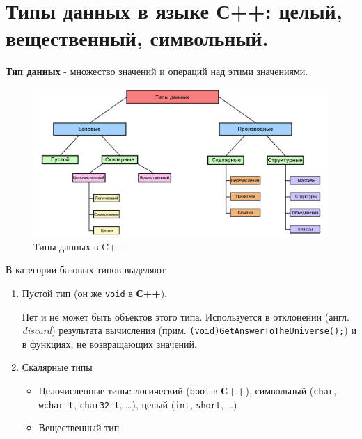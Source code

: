 \section{Типы данных в языке С++: целый, вещественный,
символьный.}\label{ux442ux438ux43fux44b-ux434ux430ux43dux43dux44bux445-ux432-ux44fux437ux44bux43aux435-ux441-ux446ux435ux43bux44bux439-ux432ux435ux449ux435ux441ux442ux432ux435ux43dux43dux44bux439-ux441ux438ux43cux432ux43eux43bux44cux43dux44bux439.}

\textbf{Тип данных} - множество значений и операций над этими
значениями.

\begin{figure}
\centering
\includegraphics{./res/сpp-types.png}
\caption{Типы данных в C++}
\end{figure}

В категории базовых типов выделяют

\begin{enumerate}
\def\labelenumi{\arabic{enumi})}
\item
  Пустой тип (он же \texttt{void} в \textbf{С++}).

  Нет и не может быть объектов этого типа. Используется в отклонении
  (англ. \emph{discard}) результата вычисления (прим.
  \texttt{(void)GetAnswerToTheUniverse();}) и в функциях, не
  возвращающих значений.
\item
  Скалярные типы

  \begin{itemize}
  \item
    Целочисленные типы: логический (\texttt{bool} в \textbf{С++}),
    символьный (\texttt{char}, \texttt{wchar\_t}, \texttt{char32\_t},
    \ldots), целый (\texttt{int}, \texttt{short}, \ldots)
  \item
    Вещественный тип
  \end{itemize}
\end{enumerate}

